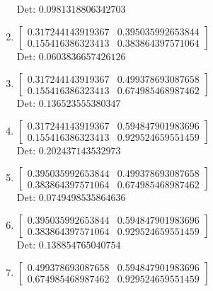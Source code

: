 \documentclass[12pt]{article}
\begin{document}
\begin{enumerate}
Det: $0.0981318806342703$\\

\item $\displaystyle \left[\begin{matrix}0.317244143919367 & 0.395035992653844\\0.155416386323413 & 0.383864397571064\end{matrix}\right]$\\

Det: $0.0603836657426126$\\

\item $\displaystyle \left[\begin{matrix}0.317244143919367 & 0.499378693087658\\0.155416386323413 & 0.674985468987462\end{matrix}\right]$\\

Det: $0.136523555380347$\\

\item $\displaystyle \left[\begin{matrix}0.317244143919367 & 0.594847901983696\\0.155416386323413 & 0.929524659551459\end{matrix}\right]$\\

Det: $0.202437143532973$\\

\item $\displaystyle \left[\begin{matrix}0.395035992653844 & 0.499378693087658\\0.383864397571064 & 0.674985468987462\end{matrix}\right]$\\

Det: $0.0749498535864636$\\

\item $\displaystyle \left[\begin{matrix}0.395035992653844 & 0.594847901983696\\0.383864397571064 & 0.929524659551459\end{matrix}\right]$\\

Det: $0.138854765040754$\\

\item $\displaystyle \left[\begin{matrix}0.499378693087658 & 0.594847901983696\\0.674985468987462 & 0.929524659551459\end{matrix}\right]$\\


\end{enumerate}
\end{document}
